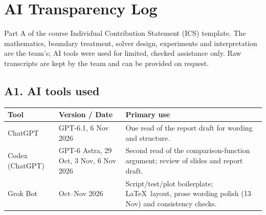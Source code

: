 \documentclass[11pt,a4paper]{article}
\theoremstyle{palplain}
\theoremstyle{paldef}
\theoremstyle{palremark}
\begin{document}
\newpage
\appendix
\section{AI Transparency Log}\label{app:ai}
\noindent Part A of the course Individual Contribution Statement (ICS) template. The mathematics, boundary treatment, solver design,
experiments and interpretation are the team's; AI tools were used for limited, checked
assistance only. Raw transcripts are kept by the team and can be provided on request.

\subsection*{A1. AI tools used}
\begin{table}[H]
\centering\small
\begin{tabular}{@{}>{\raggedright\arraybackslash}p{3.0cm}>{\raggedright\arraybackslash}p{3.6cm}>{\raggedright\arraybackslash}p{8.4cm}@{}}
\toprule
Tool & Version / Date & Primary use \\
\midrule
ChatGPT & GPT-6.1, 6 Nov 2026 & One read of the report draft for wording and structure. \\
Codex (ChatGPT) & GPT-6 Astra, 29 Oct, 3 Nov, 6 Nov 2026 & Second read of the comparison-function argument; review of slides and report draft. \\
Grok Bot & Oct--Nov 2026 & Script/test/plot boilerplate; \LaTeX\ layout, prose wording polish (13 Nov) and consistency checks. \\
\bottomrule
\end{tabular}
\end{table}
\end{document}
